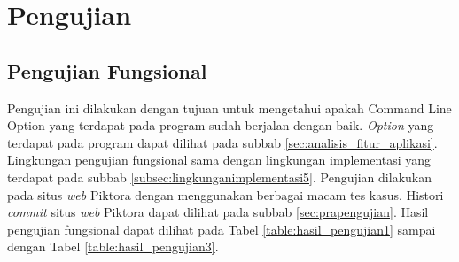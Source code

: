 \section{Pengujian}
\label{sec:pengujian}

\subsection{Pengujian Fungsional}
\label{sec:pengujian_fungsional} 
Pengujian ini dilakukan dengan tujuan untuk mengetahui apakah Command Line Option yang terdapat pada program sudah berjalan dengan baik. \textit{Option} yang terdapat pada program dapat dilihat pada subbab \ref{sec:analisis_fitur_aplikasi}. Lingkungan pengujian fungsional sama dengan lingkungan implementasi yang terdapat pada subbab \ref{subsec:lingkunganimplementasi5}. Pengujian dilakukan pada situs \textit{web} Piktora dengan menggunakan berbagai macam tes kasus. Histori \textit{commit} situs \textit{web} Piktora dapat dilihat pada subbab \ref{sec:prapengujian}. Hasil pengujian fungsional dapat dilihat pada Tabel \ref{table:hasil_pengujian1} sampai dengan Tabel \ref{table:hasil_pengujian3}.


